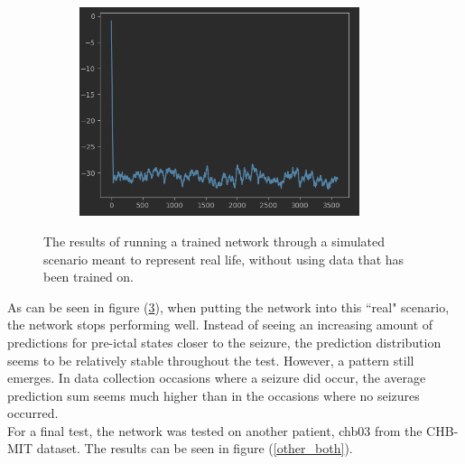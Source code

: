 \begin{figure}[H]
\begin{subfigure}{0.5\textwidth}
  \caption{}
  \label{real_no_sub1}
\end{subfigure}%
\begin{subfigure}{0.5\textwidth}
  \centering
  \includegraphics[width=0.9\textwidth]{images/f2-4.png}
  \caption{}
  \label{real_no_sub2}
\end{subfigure}
\caption{The results of running a trained network through a simulated scenario meant to represent real life, without using data that has been trained on.}
\label{real_both}
\end{figure}

As can be seen in figure (\ref{real_both}), when putting the network into this ``real" scenario, the network stops performing well. Instead of seeing an increasing amount of predictions for pre-ictal states closer to the seizure, the prediction distribution seems to be relatively stable throughout the test. However, a pattern still emerges. In data collection occasions where a seizure did occur, the average prediction sum seems much higher than in the occasions where no seizures occurred. \\

For a final test, the network was tested on another patient, chb03 from the CHB-MIT dataset. The results can be seen in figure (\ref{other_both}).

